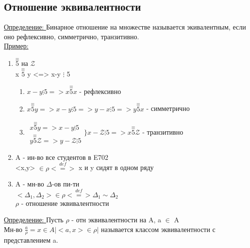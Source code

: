 \documentclass[12pt]{article}
\begin{document}
    \subsection{Отношение эквивалентности}
    \underline{Определение: }Бинарное отношение на множестве называется экивалентным, если оно 
    рефлексивно, симметрично, транзитивно.\\
    \underline{Пример:}\\
    \begin{enumerate}
        \item $\overset{\equiv}{5}$ на $\mathcal{Z}$\\
        x $\overset{\equiv}{5}$ y <=> x-y $\vdots$ 5\\
        \begin{enumerate}
            \item $x-y \vdots 5 => x \overset{\equiv}{5} x$ - рефлексивно
            \item $x \overset{\equiv}{5} y => x-y \vdots 5 => y-x \vdots 5 => y \overset{\equiv}{5}
            x $ - симметрично
            \item $\begin{matrix}
                x \overset{\equiv}{5} y => x-y \vdots 5\\
                y \overset{\equiv}{5} \mathcal{Z} => y - \mathcal{Z} \vdots 5
                \end{matrix} \Bigg\} x-\mathcal{Z} \vdots 5 => x \overset{\equiv}{5} \mathcal{Z}$ - транзитивно 
        \end{enumerate}
        \item A - ин-во все студентов в E702\\
        <x,y> $\in \rho \overset{def}{<=>}$ x и y сидят в одном ряду
        \item A - мн-во $\Delta $-ов пи-ти\\
        $<\Delta_1,\Delta_2> \in \rho \overset{def}{<=>} \Delta_1 \sim  \Delta_2$\\
        $\rho$ - отношение эквивалентности
    \end{enumerate}
    \underline{Определение: } Пусть $\rho$ - отн эквивалентности на A, a $\in$ A\\
    Мн-во $\frac{a}{\rho}=x \in A \Big|<a,x> \in \rho \Big| $ называется классом эквивалентности
    с представлением a.
\end{document}
